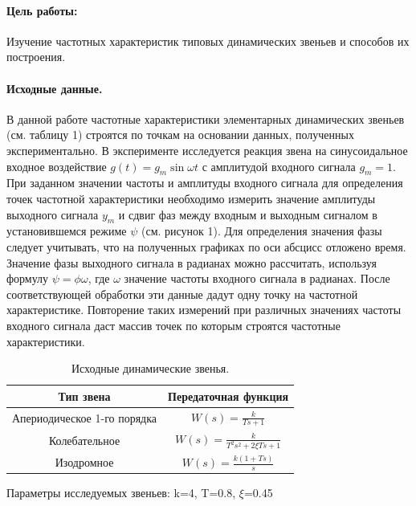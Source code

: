 \documentclass[a4paper,12pt]{article} %
\begin{document}


\paragraph{Цель работы:}Изучение частотных характеристик типовых динамических звеньев и способов их построения.%
\paragraph{Исходные данные.}
В данной работе частотные характеристики элементарных динамических звеньев (см. таблицу 1) строятся по точкам на основании данных, полученных экспериментально. В эксперименте исследуется реакция звена на синусоидальное входное воздействие $g(t) = g_m\sin{\omega t}$ с амплитудой входного сигнала $g_m=1$. При заданном значении частоты и амплитуды входного сигнала для определения точек частотной характеристики необходимо измерить значение амплитуды выходного сигнала $y_m$ и сдвиг фаз между входным и выходным сигналом в установившемся режиме $\psi$ (см. рисунок 1). Для определения значения фазы следует учитывать, что на полученных графиках по оси абсцисс отложено время. Значение фазы выходного сигнала в радианах можно рассчитать, используя формулу $\psi=\phi\omega$, где $\omega$ значение частоты входного сигнала в радианах. После соответствующей обработки эти данные дадут одну точку на частотной характеристике. Повторение таких измерений при различных значениях частоты входного сигнала даст массив точек по которым строятся частотные характеристики.
\begin{table}[h!]
	\renewcommand{\arraystretch}{1.8} %
	\centering
	\begin{threeparttable}
		\caption{Исходные динамические звенья.}
		\begin{tabular}{|c|c|}
			\hline Тип звена & Передаточная функция\\
			\hline Апериодическое 1-го порядка & $W(s) = 
			\displaystyle{\frac{k}{Ts + 1}}$ \\
			\hline Колебательное & $W(s) =
			\displaystyle{\frac{k}{T^2s^2 + 2\xi Ts + 1}}$ \\ 
			\hline Изодромное & $W(s) = \displaystyle{\frac{k(1 + Ts)}{s}}$ \\
			\hline
		\end{tabular}
	\end{threeparttable}
\end{table} 
\par
Параметры исследуемых звеньев: k=4, T=0.8, $\xi$=0.45
\end{document}
